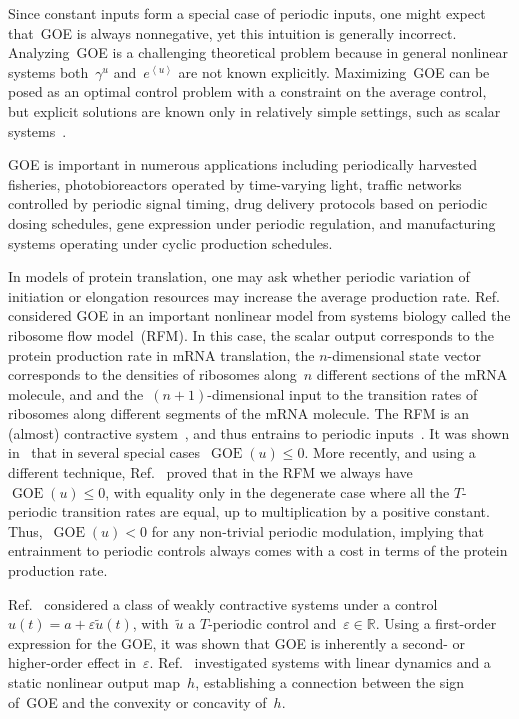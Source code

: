 \documentclass[onecolumn]{IEEEtran}
\newcommand{\R}{\mathbb{R}}
\newcommand{\GOE}{\operatorname{GOE}}
\newcommand{\avg}[1]{\left\langle #1\right\rangle}
\begin{document}
Since constant inputs form a special case of periodic inputs, one might expect
that~GOE is always nonnegative, yet this intuition is generally
incorrect. 
Analyzing~GOE is a challenging theoretical
problem 
because in general  nonlinear systems both~$\gamma^u$ and~$e^{\avg{u}}$ are not known explicitly. Maximizing~GOE can   be posed as  an optimal control problem with a constraint on the average control, but 
explicit solutions are known only in relatively simple settings, such as scalar
systems~\cite{rapo_convex}.

  GOE is important in 
  numerous applications 
 including periodically harvested fisheries, photobioreactors operated  by
time-varying light, traffic networks controlled by periodic signal timing,  
drug delivery protocols based on periodic  dosing schedules, gene expression  under periodic  regulation, and
manufacturing systems operating under cyclic production schedules.



In models of
protein translation, one may ask whether periodic variation of initiation or
elongation resources may increase the average production rate.  
Ref.~\cite{GOE_RFM_2023}  considered GOE
in an important nonlinear model from  systems biology called the ribosome flow model~(RFM). 
In this case, the scalar output corresponds to  the protein production rate in mRNA translation,
the $n$-dimensional  state vector corresponds to the densities of ribosomes along~$n$ different sections of the mRNA molecule, and 
and the~$(n+1)$-dimensional  input to the transition rates of ribosomes along different segments  of the mRNA molecule. The RFM is an (almost) contractive system~\cite{weak_contract}, and thus entrains to periodic  inputs~\cite{Margaliot2014Entrain}. 
It was shown in~\cite{GOE_RFM_2023} 
that in several special cases~$\GOE(u)\leq 0$. More recently, and using a different technique, Ref.~\cite{cost_of_entrain} proved that in the RFM we always  have~$\GOE(u)\leq 0$, with equality only in  the degenerate case 
where all the $T$-periodic transition rates are equal, up to multiplication by a positive constant.
Thus,~$\GOE(u)<0$
for any non-trivial periodic modulation, implying  that entrainment to periodic controls always comes with a cost in terms of the protein production rate. 

Ref.~\cite{Katz2024} 
  considered a class of 
  weakly contractive systems under a control~$u(t)=a+\varepsilon \tilde u(t)$, with~$\tilde u$ a $T$-periodic control and~$\varepsilon\in \R$.
  Using   a first-order expression
for the GOE, it was shown   that GOE is
inherently a second- or higher-order effect in~$\varepsilon$.
Ref.~\cite{MassasMargaliot_linear_sys_nonlin_output} investigated systems with
linear dynamics and a static nonlinear output map~$h$, establishing a connection between the
sign of~GOE and the convexity or concavity of~$h$.
\end{document}
